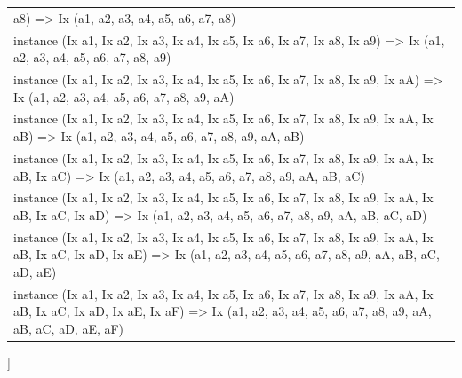 \begin{haddockdesc}
\begin{tabular}{@{}l}
a8) => Ix (a1, a2, a3, a4, a5, a6, a7, a8)\\instance (Ix a1, Ix a2, Ix a3, Ix a4, Ix a5, Ix a6, Ix a7, Ix a8, Ix a9) => Ix (a1, a2, a3, a4, a5, a6, a7, a8, a9)\\instance (Ix a1, Ix a2, Ix a3, Ix a4, Ix a5, Ix a6, Ix a7, Ix a8, Ix a9, Ix aA) => Ix (a1, a2, a3, a4, a5, a6, a7, a8, a9, aA)\\instance (Ix a1, Ix a2, Ix a3, Ix a4, Ix a5, Ix a6, Ix a7, Ix a8, Ix a9, Ix aA, Ix aB) => Ix (a1, a2, a3, a4, a5, a6, a7, a8, a9, aA, aB)\\instance (Ix a1, Ix a2, Ix a3, Ix a4, Ix a5, Ix a6, Ix a7, Ix a8, Ix a9, Ix aA, Ix aB, Ix aC) => Ix (a1, a2, a3, a4, a5, a6, a7, a8, a9, aA, aB, aC)\\instance (Ix a1, Ix a2, Ix a3, Ix a4, Ix a5, Ix a6, Ix a7, Ix a8, Ix a9, Ix aA, Ix aB, Ix aC, Ix aD) => Ix (a1, a2, a3, a4, a5, a6, a7, a8, a9, aA, aB, aC, aD)\\instance (Ix a1, Ix a2, Ix a3, Ix a4, Ix a5, Ix a6, Ix a7, Ix a8, Ix a9, Ix aA, Ix aB, Ix aC, Ix aD, Ix aE) => Ix (a1, a2, a3, a4, a5, a6, a7, a8, a9, aA, aB, aC, aD, aE)\\instance (Ix a1, Ix a2, Ix a3, Ix a4, Ix a5, Ix a6, Ix a7, Ix a8, Ix a9, Ix aA, Ix aB, Ix aC, Ix aD, Ix aE, Ix aF) => Ix (a1, a2, a3, a4, a5, a6, a7, a8, a9, aA, aB, aC, aD, aE, aF)
\end{tabular}]
\end{haddockdesc}
